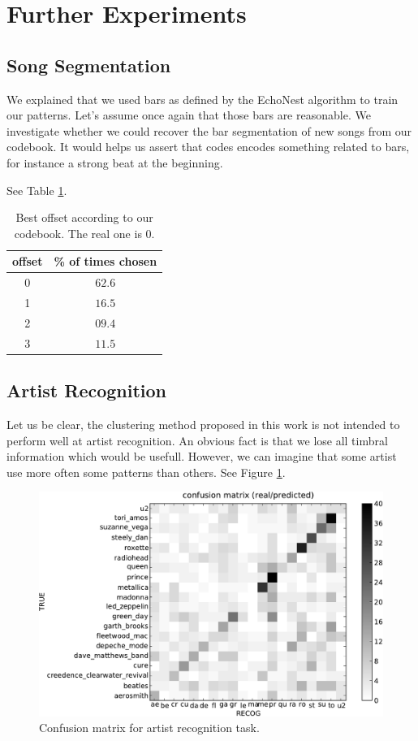 \documentclass{article}
\begin{document}
\section{Further Experiments}\label{sec:exps2}

\subsection{Song Segmentation}
We explained that we used bars as defined by the EchoNest algorithm to
train our patterns. Let's assume once again that those bars are
reasonable. We investigate whether we could recover the bar segmentation
of new songs from our codebook. It would helps us assert that codes
encodes something related to bars, for instance a strong beat at the
beginning.

See Table \ref{tab:offset}.

\begin{table}
\begin{center}
\begin{tabular}{c|c}
offset & \% of times chosen \\ \hline
0 & $\mathbf{62.6}$\\
1 & $16.5$\\
2 & $09.4$\\
3 & $11.5$\\
\end{tabular}
\end{center}
\caption{\small{
Best offset according to our codebook. The real one is $0$.
}}
\label{tab:offset}
\end{table}

\subsection{Artist Recognition}
Let us be clear, the clustering method proposed in this work is not
intended to perform well at artist recognition. An obvious fact is that
we lose all timbral information which would be usefull. However, we can
imagine that some artist use more often some patterns than others.
See Figure \ref{fig:conf_mat}.

\begin{figure}[htb]
\begin{center}
\includegraphics[width=.9\columnwidth]{conf_mat_per_artist}
\end{center}
\caption{\small{Confusion matrix for artist recognition task.}}
\label{fig:conf_mat}
\end{figure}
\end{document}
